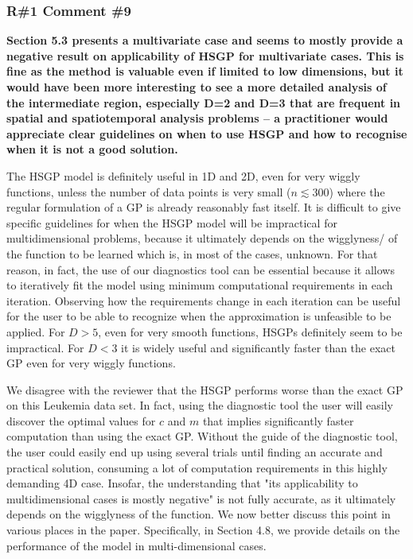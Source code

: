 \documentclass[11pt]{report}
\begin{document}
\subsubsection*{R\#1 Comment \#9}

\textbf{Section 5.3 presents a multivariate case and seems to mostly provide a negative result on applicability of HSGP for multivariate cases. This is fine as the method is valuable even if limited to low dimensions, but it would have been more interesting to see a more detailed analysis of the intermediate region, especially D=2 and D=3 that are frequent in spatial and spatiotemporal analysis problems -- a practitioner would appreciate clear guidelines on when to use HSGP and how to recognise when it is not a good solution.}

The HSGP model is definitely useful in 1D and 2D, even for very wiggly functions, unless the number of data points is very small ($n \lesssim 300$) where the regular formulation of a GP is already reasonably fast itself.
It is difficult to give specific guidelines for when the HSGP model will be impractical for multidimensional problems, because it ultimately depends on the wigglyness/ of the function to be learned which is, in most of the cases, unknown. For that reason, in fact, the use of our diagnostics tool can be essential because it allows to iteratively fit the model using minimum computational requirements in each iteration. Observing how the requirements change in each iteration can be useful for the user to be able to recognize when the approximation is unfeasible to be applied. For $D>5$, even for very smooth functions, HSGPs definitely seem to be impractical. For $D<3$ it is widely useful and significantly faster than the exact GP even for very wiggly functions.

We disagree with the reviewer that the HSGP performs worse than the exact GP on this Leukemia data set. In fact, using the diagnostic tool the user will easily discover the optimal values for $c$ and $m$ that implies significantly faster computation than using the exact GP. Without the guide of the diagnostic tool, the user could easily end up using several trials until finding an accurate and practical solution, consuming a lot of computation requirements in this highly demanding 4D case. Insofar, the understanding that "its applicability to multidimensional cases is mostly negative" is not fully accurate, as it ultimately depends on the wigglyness of the function. We now better discuss this point in various places in the paper. Specifically, in Section 4.8, we provide details on the performance of the model in multi-dimensional cases. 
\end{document}
